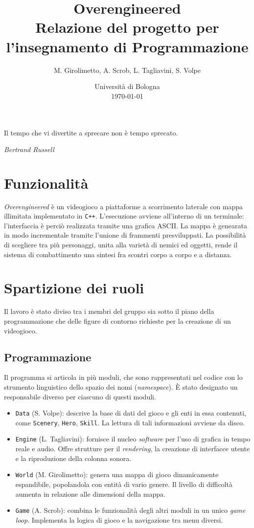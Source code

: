 \documentclass[a4paper]{article}
\title{Overengineered \\
\large Relazione del progetto per l'insegnamento di Programmazione}
\author{
  M. Girolimetto,
  A. Scrob,
  L. Tagliavini,
  S. Volpe
}
\date{
	Universit\`a di Bologna \\
  \today
}
\begin{document}
\maketitle

\epigraph{Il tempo che vi divertite a sprecare non è tempo sprecato.}
{\textit{Bertrand Russell}}

\section{Funzionalit\`a}

\emph{Overengineered} \`e un videogioco a piattaforme a scorrimento laterale con mappa
illimitata implementato in \verb!C++!. L'esecuzione avviene all'interno di un terminale:
l'interfaccia \`e perci\`o realizzata tramite una grafica ASCII. La mappa \`e
genearata in modo incrementale tramite l'unione di frammenti presviluppati. La
possibilit\`a di scegliere tra pi\`u personaggi, unita alla variet\`a di nemici
ed oggetti, rende il sistema di combattimento una sintesi fra scontri corpo a
corpo e a distanza.

\section{Spartizione dei ruoli}

Il lavoro \`e stato diviso tra i membri del gruppo sia sotto il piano della
programmazione che delle figure di contorno richieste per la creazione di un videogioco.

\subsection{Programmazione}

Il programma si articola in pi\`u moduli, che sono rappresentati nel codice con
lo strumento linguistico dello spazio dei nomi (\emph{namespace}). \`E stato
designato un responsabile diverso per ciascuno di questi moduli.
\begin{itemize}
  \item \verb!Data! (S. Volpe): descrive la base di dati del gioco e gli enti in
    essa contenuti, come \verb!Scenery!, \verb!Hero!, \verb!Skill!. La lettura
    di tali informazioni avviene da disco.
  \item \verb!Engine! (L. Tagliavini): fornisce il nucleo \emph{software} per
    l'uso di grafica in tempo reale e audio. Offre strutture per il
    \emph{rendering}, la creazione di interfacce utente e la riproduzione della
    colonna sonora. %
  \item \verb!World! (M. Girolimetto): genera una mappa di gioco dinamicamente
    espandibile, popolandola con entit\`a di vario genere. Il livello di
    difficolt\`a aumenta in relazione alle dimensioni della mappa.
  \item \verb!Game! (A. Scrob): combina le funzionalit\`a degli altri moduli in
    un unico \emph{game loop}. Implementa la logica di gioco e la navigazione
    tra menu diversi.
\end{itemize}
\end{document}
